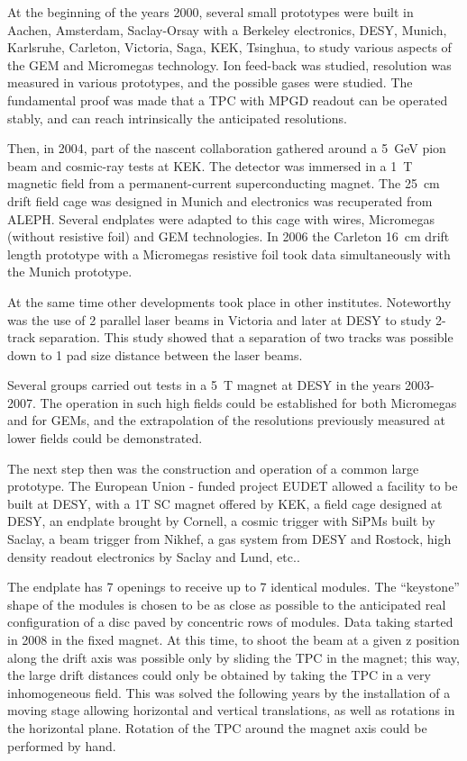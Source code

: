 At the beginning of the years 2000, several small prototypes were built in Aachen, Amsterdam, Saclay-Orsay with a Berkeley electronics, DESY, Munich, Karlsruhe, Carleton, Victoria, Saga, KEK, Tsinghua, to study various aspects of the GEM and Micromegas technology. Ion feed-back was studied, resolution was measured in various prototypes, and the possible gases were studied. The fundamental proof was made that a TPC with MPGD readout can be operated stably, and can reach intrinsically the anticipated resolutions.

Then, in 2004, part of the nascent collaboration gathered around a \SI{5}{GeV} pion beam and cosmic-ray tests at KEK. The detector was immersed in a \SI{1}{T} magnetic field from a permanent-current superconducting magnet. The \SI{25}{cm} drift field cage was designed in Munich and electronics was recuperated from ALEPH. Several endplates were adapted to this cage with wires, Micromegas (without resistive foil) and GEM technologies. In 2006 the Carleton \SI{16}{cm} drift length prototype with a Micromegas resistive foil took data simultaneously with the Munich prototype.

At the same time other developments took place in other institutes. Noteworthy was the use of 2 parallel laser beams in Victoria and later at DESY to study 2-track separation. This study showed that a separation of two tracks was possible down to 1 pad size distance between the laser beams.

Several groups carried out tests in a \SI{5}{T} magnet at DESY in the years 2003-2007. The operation in such high fields could be established for both Micromegas and for GEMs, and the extrapolation of the resolutions previously measured at lower fields could be demonstrated.

The next step then was the construction and operation of a common large prototype. The European Union - funded project EUDET allowed a facility to be built at DESY, with a 1T SC magnet offered by KEK, a field cage designed at DESY, an endplate brought by Cornell, a cosmic trigger with SiPMs built by Saclay, a beam trigger from Nikhef, a gas system from DESY and Rostock, high density readout electronics by Saclay and Lund, etc..

The endplate has 7 openings to receive up to 7 identical modules. The ``keystone'' shape of the modules is chosen to be as close as possible to the anticipated real configuration of a disc paved by concentric rows of modules. Data taking started in 2008 in the fixed magnet. At this time, to shoot the beam at a given z position along the drift axis was possible only by sliding the TPC in the  magnet; this way, the large drift distances could only be obtained by taking the TPC in a very inhomogeneous field. This was solved the following years by the installation of a moving stage allowing horizontal and vertical translations, as well as rotations in the horizontal plane. Rotation of the TPC around the  magnet axis could be performed by hand.

